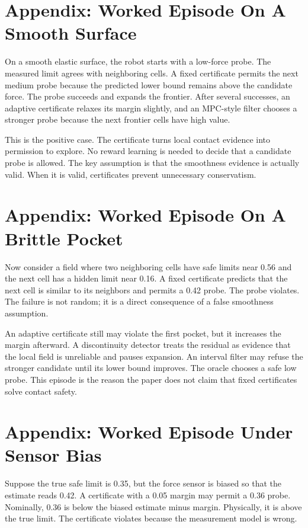 \documentclass{article}
\begin{document}
\section{Appendix: Worked Episode On A Smooth Surface}

On a smooth elastic surface, the robot starts with a low-force probe. The
measured limit agrees with neighboring cells. A fixed certificate permits the
next medium probe because the predicted lower bound remains above the candidate
force. The probe succeeds and expands the frontier. After several successes,
an adaptive certificate relaxes its margin slightly, and an MPC-style filter
chooses a stronger probe because the next frontier cells have high value.

This is the positive case. The certificate turns local contact evidence into
permission to explore. No reward learning is needed to decide that a candidate
probe is allowed. The key assumption is that the smoothness evidence is
actually valid. When it is valid, certificates prevent unnecessary
conservatism.

\section{Appendix: Worked Episode On A Brittle Pocket}

Now consider a field where two neighboring cells have safe limits near 0.56
and the next cell has a hidden limit near 0.16. A fixed certificate predicts
that the next cell is similar to its neighbors and permits a 0.42 probe. The
probe violates. The failure is not random; it is a direct consequence of a
false smoothness assumption.

An adaptive certificate still may violate the first pocket, but it increases
the margin afterward. A discontinuity detector treats the residual as evidence
that the local field is unreliable and pauses expansion. An interval filter may
refuse the stronger candidate until its lower bound improves. The oracle
chooses a safe low probe. This episode is the reason the paper does not claim
that fixed certificates solve contact safety.

\section{Appendix: Worked Episode Under Sensor Bias}

Suppose the true safe limit is 0.35, but the force sensor is biased so that the
estimate reads 0.42. A certificate with a 0.05 margin may permit a 0.36 probe.
Nominally, 0.36 is below the biased estimate minus margin. Physically, it is
above the true limit. The certificate violates because the measurement model is
wrong.
\end{document}
